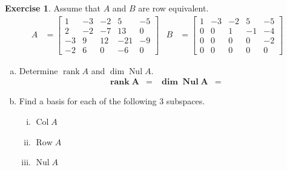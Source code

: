 \documentclass[10pt]{book}
\theoremstyle{definition}
\newtheorem{exercise}{Exercise}[section]
\DeclareMathOperator{\Nul}{Nul}
\DeclareMathOperator{\Col}{Col}
\DeclareMathOperator{\Row}{Row}
\DeclareMathOperator{\rank}{rank}
\begin{document}
\begin{exercise} %
	Assume that $A$ and $B$ are row equivalent.
	\begin{align*}
	A &= \begin{bmatrix}1&-3&-2&5&-5\\2&-2&-7&13&0\\-3&9&12&-21&-9\\-2&6&0&-6&0\end{bmatrix} &
	B &= \begin{bmatrix}1&-3&-2&5&-5\\0&0&1&-1&-4\\0&0&0&0&-2\\0&0&0&0&0\end{bmatrix}
	\end{align*}
	\begin{enumerate}[(a)]
		\item Determine $\rank A$ and $\dim\Nul A$.
		\begin{align*}
		\boldsymbol{\rank A} &=		& \boldsymbol{\dim\Nul A} &=
		\end{align*}
		\item Find a basis for each of the following 3 subspaces.
			\begin{multicols}{2}
				\begin{enumerate}[(i)]
					\item $\Col A$ \vspace{1in}
					\item $\Row A$
					
					\columnbreak
					\item $\Nul A$ %
				\end{enumerate}
			\end{multicols}
	\end{enumerate}
	

\end{exercise}
\end{document}
